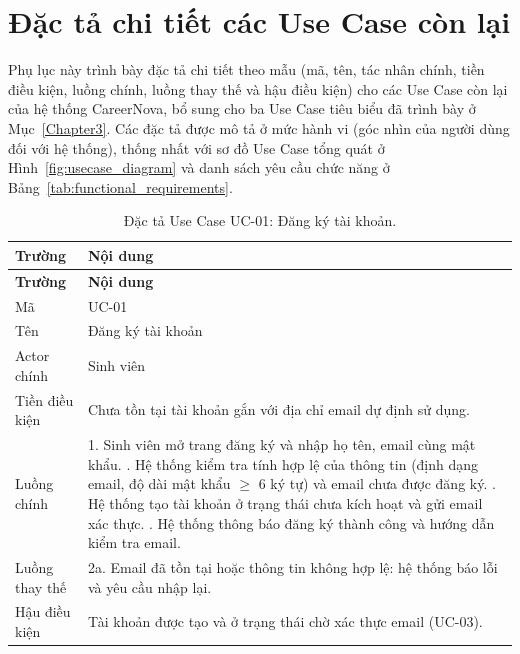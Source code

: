 \chapter{Đặc tả chi tiết các Use Case còn lại}
\label{Appendix:usecase}

Phụ lục này trình bày đặc tả chi tiết theo mẫu (mã, tên, tác nhân chính, tiền điều kiện, luồng chính, luồng thay thế và hậu điều kiện) cho các Use Case còn lại của hệ thống CareerNova, bổ sung cho ba Use Case tiêu biểu đã trình bày ở Mục~\ref{Chapter3}. Các đặc tả được mô tả ở mức hành vi (góc nhìn của người dùng đối với hệ thống), thống nhất với sơ đồ Use Case tổng quát ở Hình~\ref{fig:usecase_diagram} và danh sách yêu cầu chức năng ở Bảng~\ref{tab:functional_requirements}.

\begin{longtable}{|L{3.5cm}|L{10cm}|}
\caption{Đặc tả Use Case UC-01: Đăng ký tài khoản.}
\label{tab:uc01} \\
\hline
\textbf{Trường} & \textbf{Nội dung} \\
\hline
\endfirsthead
\hline
\textbf{Trường} & \textbf{Nội dung} \\
\hline
\endhead
Mã & UC-01 \\
\hline
Tên & Đăng ký tài khoản \\
\hline
Actor chính & Sinh viên \\
\hline
Tiền điều kiện & Chưa tồn tại tài khoản gắn với địa chỉ email dự định sử dụng. \\
\hline
Luồng chính & 1. Sinh viên mở trang đăng ký và nhập họ tên, email cùng mật khẩu. . Hệ thống kiểm tra tính hợp lệ của thông tin (định dạng email, độ dài mật khẩu $\ge$ 6 ký tự) và email chưa được đăng ký. . Hệ thống tạo tài khoản ở trạng thái chưa kích hoạt và gửi email xác thực. . Hệ thống thông báo đăng ký thành công và hướng dẫn kiểm tra email. \\
\hline
Luồng thay thế & 2a. Email đã tồn tại hoặc thông tin không hợp lệ: hệ thống báo lỗi và yêu cầu nhập lại. \\
\hline
Hậu điều kiện & Tài khoản được tạo và ở trạng thái chờ xác thực email (UC-03). \\
\hline
\end{longtable}

